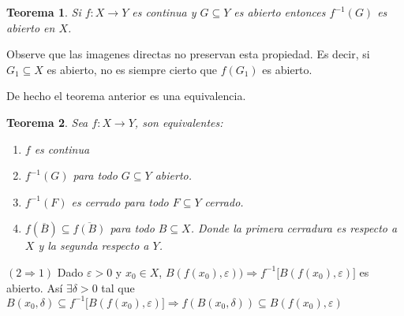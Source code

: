 \documentclass[12pt]{article}
\theoremstyle{plain}
\newtheorem{Th}{Teorema}[subsection]   %
\theoremstyle{definition}
\theoremstyle{remark}
\numberwithin{equation}{section}
\renewcommand{\:}{\colon}           %
\begin{document}
\begin{multicols}{2}
\begin{Th}
  Si $f\colon X\to Y$ es continua y $G\subseteq Y$ es abierto entonces $f^{-1}(G)$ es abierto en $X$.
\end{Th}

Observe que las imagenes directas no preservan esta propiedad. Es decir, si $G_1\subseteq X$ es abierto, no es siempre cierto que $f(G_1)$ es abierto.\par
De hecho el teorema anterior es una equivalencia.
\begin{Th}
  Sea $f\colon X\to Y$, son equivalentes:
  \begin{enumerate}
    \item $f$ es continua
    \item $f^{-1}(G)$ para todo $G\subseteq Y$ abierto.
    \item $f^{-1}(F)$ es cerrado para todo $F\subseteq Y$ cerrado.
    \item $f(\overline{B})\subseteq \overline{f(B)}$ para todo $B\subseteq X$. Donde la primera cerradura es respecto a $X$ y la segunda respecto a $Y$.
  \end{enumerate}
\end{Th}

\begin{ptcbp}
$(\mathit{2}\Rightarrow\mathit{1})$ Dado $\varepsilon>0$ y $x_0\in X$, $B(f(x_0),\varepsilon))\Rightarrow f^{-1}\lbrack B(f(x_0),\varepsilon)\rbrack$ es abierto. Así $\exists\delta>0$ tal que $B(x_0,\delta)\subseteq f^{-1}\lbrack B(f(x_0),\varepsilon)\rbrack\Rightarrow f(B(x_0,\delta))\subseteq B(f(x_0),\varepsilon)$

\end{ptcbp}


\end{multicols}
\end{document}
